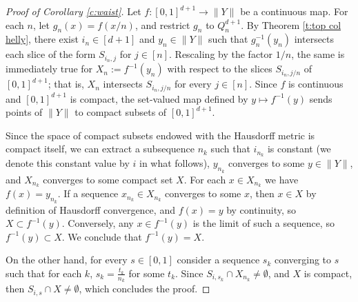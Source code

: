 \documentclass[12pt,a4paper,oneside]{amsart}\sloppy
\theoremstyle{definition}
\newcommand{\cubical}[2]{Q_{#1}^{#2}}
\newcommand{\slice}[2]{S_{#1,#2} }
\begin{document}
\begin{proof}[Proof of Corollary \ref{c:waist}]
Let $f \colon [0,1]^{d+1}\to \|Y\|$ be a continuous map. For each $n$, let $g_n(x)=f(x/n)$, and restrict $g_n$ to $\cubical{n}{d+1}$. By Theorem \ref{t:top col helly}, there exist $i_n \in [d+1]$ and $y_n \in \|Y\|$ such that $g_n^{-1}(y_n)$ intersects each slice of the form $\slice{i_n}{j}$ for $j\in [n]$. Rescaling by the factor $1/n$, the same is immediately true for $X_n:=f^{-1}(y_n)$ with respect to the slices $\slice{i_n}{j/n}$ of $[0,1]^{d+1}$; that is, $X_n$ intersects $\slice{i_n}{j/n}$ for every $j\in [n]$.
Since $f$ is continuous and $[0,1]^{d+1}$ is compact, the set-valued map defined by $y \mapsto f^{-1}(y)$ sends points of $\|Y\|$ to compact subsets of $[0,1]^{d+1}$.

Since the space of compact subsets endowed with the Hausdorff metric is compact itself, we can extract a subsequence $n_k$ such that $i_{n_k}$ is constant (we denote this constant value by $i$ in what follows), $y_{n_k}$ converges to some $y \in \|Y\|$, and $X_{n_k}$ converges to some compact set $X$. For each $x \in X_{n_k}$ we have $f(x)=y_{n_k}$. If a sequence $x_{n_k} \in X_{n_k}$ converges to some $x$, then $x \in X$ by definition of Hausdorff convergence, and $f(x)=y$ by continuity, so $X\subset f^{-1}(y)$. Conversely, any $x\in f^{-1}(y)$ is the limit of such a sequence, so $f^{-1}(y)\subset X$. We conclude that $f^{-1}(y)=X$.

On the other hand, for every $s \in [0,1]$ consider a sequence $s_k$ converging to $s$ such that for each $k$, $s_k=\frac{t_k}{n_k}$ for some $t_k$. 
Since $\slice{i}{s_k} \cap X_{n_k}\neq \emptyset$, and $X$ is compact, then $\slice{i}{s} \cap X \neq \emptyset$, which concludes the proof. 
\end{proof}
\end{document}
